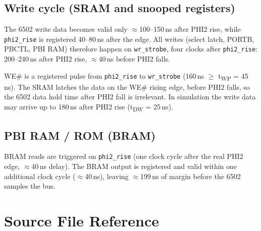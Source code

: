 \documentclass[11pt,a4paper]{article}
\newcommand{\cmd}[1]{\texttt{#1}}
\begin{document}
\subsection{Write cycle (SRAM and snooped registers)}

The 6502 write data becomes valid only $\approx$100--150\,ns after PHI2
rise, while \cmd{phi2\_rise} is registered 40--80\,ns after the edge.
All writes (select latch, PORTB, PBCTL, PBI RAM) therefore happen on
\cmd{wr\_strobe}, four clocks after \cmd{phi2\_rise}: 200--240\,ns
after PHI2 rise, $\approx$40\,ns before PHI2 falls.

WE\# is a registered pulse from \cmd{phi2\_rise} to \cmd{wr\_strobe}
(160\,ns $\geq$ t\textsubscript{WP} = 45\,ns).  The SRAM latches the data
on the WE\# rising edge, before PHI2 falls, so the 6502 data hold time
after PHI2 fall is irrelevant.  In simulation the write data may arrive
up to 180\,ns after PHI2 rise (t\textsubscript{DW} = 25\,ns).

\subsection{PBI RAM / ROM (BRAM)}

BRAM reads are triggered on \cmd{phi2\_rise} (one clock cycle after the
real PHI2 edge, $\approx$40\,ns delay).  The BRAM output is registered
and valid within one additional clock cycle ($\approx$40\,ns), leaving
$\approx$199\,ns of margin before the 6502 samples the bus.

\section{Source File Reference}
\end{document}
